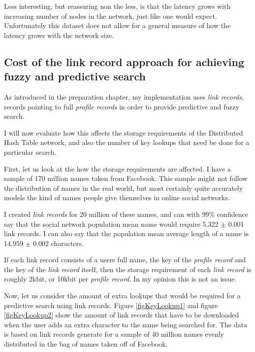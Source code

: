 Less interesting, but reassuring non the less, is that the latency grows with increasing number of nodes in the network, just like one would expect. Unfortunately this dataset does not allow for a general measure of how the latency grows with the network size.

\subsection{Cost of the link record approach for achieving fuzzy and predictive search}
As introduced in the preparation chapter, my implementation uses \emph{link records}, records pointing to full \emph{profile records} in order to provide predictive and fuzzy search.

I will now evaluate how this affects the storage requirements of the Distributed Hash Table network, and also the number of key lookups that need be done for a particular search.

First, let us look at the how the storage requirements are affected.
I have a sample of 170 million names taken from Facebook. This sample might not follow the distribution of names in the real world, but most certainly quite accurately models the kind of names people give themselves in online social networks.

I created \emph{link records} for 20 million of these names, and can with 99\% confidence say that the social network population mean name would require 5.322 $\pm$ 0.001 link records. I can also say that the population mean average length of a name is 14.959 $\pm$ 0.002 characters.

If each link record consists of a users full name, the key of the \emph{profile record} and the key of the \emph{link record} itself, then the storage requirement of each \emph{link record} is roughly 2kbit, or 10kbit per \emph{profile record}.
In my opinion this is not an issue.

Now, let us consider the amount of extra lookups that would be required for a predictive search using link records. Figure \ref{figKeyLookup1} and figure \ref{figKeyLookup2} show the amount of link records that have to be downloaded when the user adds an extra character to the name being searched for. The data is based on link records generate for a sample of 40 million names evenly distributed in the bag of names taken off of Facebook.


